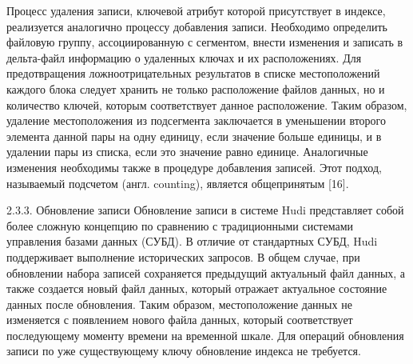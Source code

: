 Процесс удаления записи, ключевой атрибут которой присутствует в индексе, реализуется аналогично процессу добавления записи. Необходимо определить файловую группу, ассоциированную с сегментом, внести изменения и записать в дельта-файл информацию о удаленных ключах и их расположениях. Для предотвращения ложноотрицательных результатов в списке местоположений каждого блока следует хранить не только расположение файлов данных, но и количество ключей, которым соответствует данное расположение. Таким образом, удаление местоположения из подсегмента заключается в уменьшении второго элемента данной пары на одну единицу, если значение больше единицы, и в удалении пары из списка, если это значение равно единице. Аналогичные изменения необходимы также в процедуре добавления записей. Этот подход, называемый подсчетом (англ. counting), является общепринятым [16].

2.3.3. Обновление записи
Обновление записи в системе Hudi представляет собой более сложную концепцию по сравнению с традиционными системами управления базами данных (СУБД). В отличие от стандартных СУБД, Hudi поддерживает выполнение исторических запросов. В общем случае, при обновлении набора записей сохраняется предыдущий актуальный файл данных, а также создается новый файл данных, который отражает актуальное состояние данных после обновления. Таким образом, местоположение данных не изменяется с появлением нового файла данных, который соответствует последующему моменту времени на временной шкале. Для операций обновления записи по уже существующему ключу обновление индекса не требуется.
